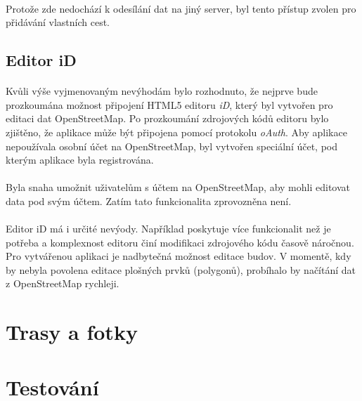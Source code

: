 \documentclass[11pt,a4paper,titlepage,oneside]{book}
\begin{document}
				\paragraph{} Protože zde nedochází k odesílání dat na jiný server, byl tento přístup zvolen pro přidávání vlastních cest.
			\subsection{Editor iD} 
				\paragraph{} Kvůli výše vyjmenovaným nevýhodám bylo rozhodnuto, že nejprve bude prozkoumána možnost připojení HTML5 editoru \textit{iD}, který byl vytvořen pro editaci dat OpenStreetMap. Po prozkoumání zdrojových kódů editoru bylo zjištěno, že aplikace může být připojena pomocí protokolu \textit{oAuth}. Aby aplikace nepoužívala osobní účet na OpenStreetMap, byl vytvořen speciální účet, pod kterým aplikace byla registrována. 
				\paragraph{}{\Large Byla snaha umožnit uživatelům s účtem na OpenStreetMap, aby mohli editovat data pod svým účtem. Zatím tato funkcionalita zprovozněna není.}
				\paragraph{} Editor iD má i určité nevýody. Například poskytuje více funkcionalit než je potřeba a komplexnost editoru činí modifikaci zdrojového kódu časově náročnou. Pro vytvářenou aplikaci je nadbytečná možnost editace budov. V momentě, kdy by nebyla povolena editace plošných prvků (polygonů), probíhalo by načítání dat z OpenStreetMap rychleji. 
		\section{Trasy a fotky}
			\paragraph{}

		\section{Testování}


\end{document}
